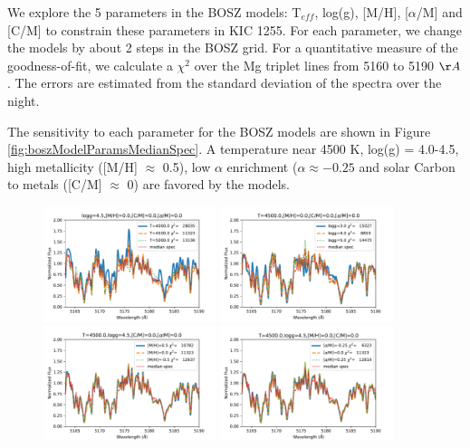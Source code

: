 \documentclass[preprint]{aastex61}
\newcommand{\shStar}{KIC 1255}
\begin{document}
We explore the 5 parameters in the BOSZ models: T$_{eff}$, log(g), [M/H], [$\alpha$/M] and [C/M] to constrain these parameters in \shStar.
For each parameter, we change the models by about 2 steps in the BOSZ grid.
For a quantitative measure of the goodness-of-fit, we calculate a $\chi^2$ over the Mg triplet lines from 5160 to 5190 $\AA$.
The errors are estimated from the standard deviation of the spectra over the night.

The sensitivity to each parameter for the BOSZ models are shown in Figure \ref{fig:boszModelParamsMedianSpec}.
A temperature near 4500 K, log(g) = 4.0-4.5, high metallicity ([M/H] $\approx$ 0.5), low $\alpha$ enrichment ($\alpha \approx -0.25$ and solar Carbon to metals ([C/M] $\approx$ 0) are favored by the models.

\begin{figure}[!hbtp]
\begin{centering}
\includegraphics[width=0.45\textwidth]{images/bosz_model_exploration/T_EFF_exploration.pdf}
\includegraphics[width=0.45\textwidth]{images/bosz_model_exploration/LOGG_exploration}
\includegraphics[width=0.45\textwidth]{images/bosz_model_exploration/MH_exploration.pdf}
\includegraphics[width=0.45\textwidth]{images/bosz_model_exploration/ALPHA_exploration.pdf}

\end{centering}
\end{figure}
\end{document}
